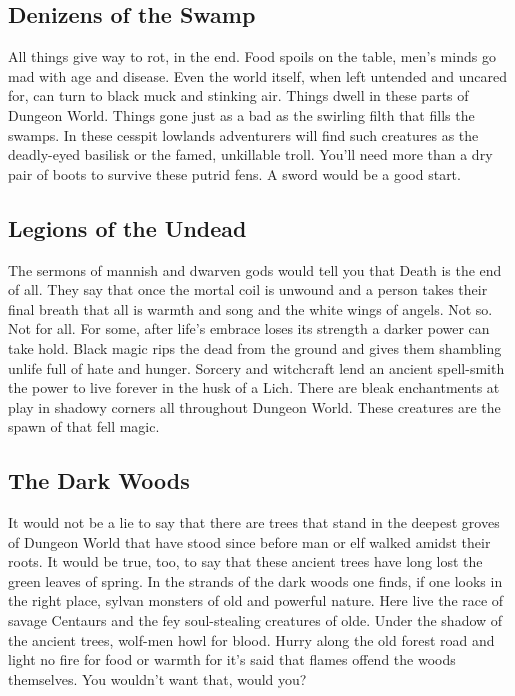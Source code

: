  
\subsection{Denizens of the Swamp}    
 

All things give way to rot, in the end. Food spoils on the table, men's minds go mad with age and disease. Even the world itself, when left untended and uncared for, can turn to black muck and stinking air. Things dwell in these parts of Dungeon World. Things gone just as a bad as the swirling filth that fills the swamps. In these cesspit lowlands adventurers will find such creatures as the deadly-eyed basilisk or the famed, unkillable troll. You'll need more than a dry pair of boots to survive these putrid fens. A sword would be a good start.

 
\subsection{Legions of the Undead}    
 

The sermons of mannish and dwarven gods would tell you that Death is the end of all. They say that once the mortal coil is unwound and a person takes their final breath that all is warmth and song and the white wings of angels. Not so. Not for all. For some, after life's embrace loses its strength a darker power can take hold. Black magic rips the dead from the ground and gives them shambling unlife full of hate and hunger. Sorcery and witchcraft lend an ancient spell-smith the power to live forever in the husk of a Lich. There are bleak enchantments at play in shadowy corners all throughout Dungeon World. These creatures are the spawn of that fell magic.

 
\subsection{The Dark Woods}    
 

It would not be a lie to say that there are trees that stand in the deepest groves of Dungeon World that have stood since before man or elf walked amidst their roots. It would be true, too, to say that these ancient trees have long lost the green leaves of spring. In the strands of the dark woods one finds, if one looks in the right place, sylvan monsters of old and powerful nature. Here live the race of savage Centaurs and the fey soul-stealing creatures of olde. Under the shadow of the ancient trees, wolf-men howl for blood. Hurry along the old forest road and light no fire for food or warmth for it's said that flames offend the woods themselves. You wouldn't want that, would you?

